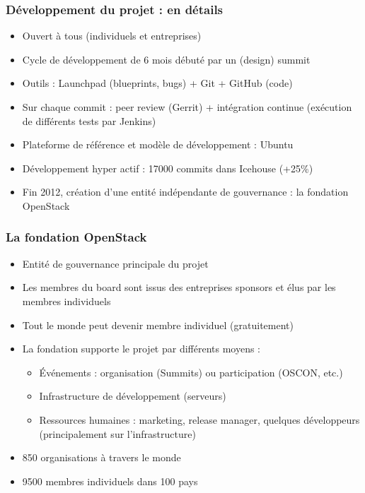   \begin{frame}
    \frametitle{Développement du projet : en détails}
    \begin{itemize}
      \item Ouvert à tous (individuels et entreprises)\pause
      \item Cycle de développement de 6 mois débuté par un (design) summit\pause
      \item Outils : Launchpad (blueprints, bugs) + Git + GitHub (code)\pause
      \item Sur chaque commit : peer review (Gerrit) + intégration continue (exécution de différents tests par Jenkins)\pause
      \item Plateforme de référence et modèle de développement : Ubuntu\pause
      \item Développement hyper actif : 17000 commits dans Icehouse (+25\%)\pause
      \item Fin 2012, création d'une entité indépendante de gouvernance : la fondation OpenStack
    \end{itemize}
  \end{frame}

  \begin{frame}
    \frametitle{La fondation OpenStack}
    \begin{itemize}
      \item Entité de gouvernance principale du projet
      \item Les membres du board sont issus des entreprises sponsors et élus par les membres individuels
      \item Tout le monde peut devenir membre individuel (gratuitement)
      \item La fondation supporte le projet par différents moyens :
      \begin{itemize}
        \item Événements : organisation (Summits) ou participation (OSCON, etc.)
        \item Infrastructure de développement (serveurs)
        \item Ressources humaines : marketing, release manager, quelques développeurs (principalement sur l'infrastructure)
      \end{itemize}
      \item 850 organisations à travers le monde
      \item 9500 membres individuels dans 100 pays
    \end{itemize}
  \end{frame}

